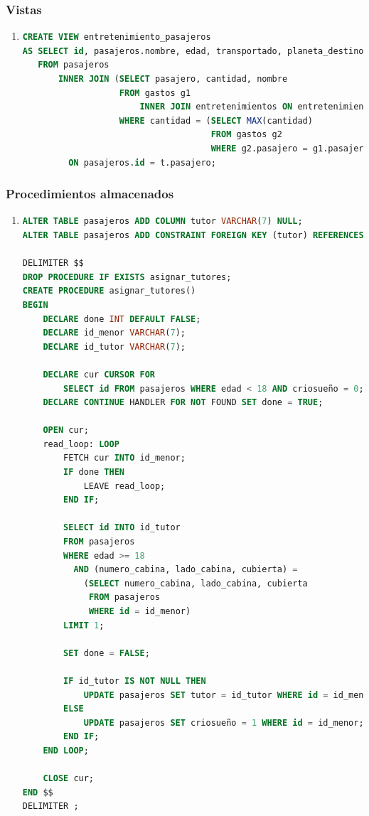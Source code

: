 \documentclass{db-practice}
\begin{document}
\subsubsection*{Vistas}
\begin{enumerate}
\item 
\begin{lstlisting}[language=SQL]
CREATE VIEW entretenimiento_pasajeros
AS SELECT id, pasajeros.nombre, edad, transportado, planeta_destino, sistema_destino, cubierta, numero_cabina, lado_cabina, cantidad, t.nombre AS entretenimiento
   FROM pasajeros
       INNER JOIN (SELECT pasajero, cantidad, nombre
                   FROM gastos g1
                       INNER JOIN entretenimientos ON entretenimientos.id = g1.entretenimiento
                   WHERE cantidad = (SELECT MAX(cantidad)
                                     FROM gastos g2
                                     WHERE g2.pasajero = g1.pasajero)) t
         ON pasajeros.id = t.pasajero;
\end{lstlisting}
\end{enumerate}

\subsubsection*{Procedimientos almacenados}
\begin{enumerate}
\item
\begin{lstlisting}[language=SQL]
ALTER TABLE pasajeros ADD COLUMN tutor VARCHAR(7) NULL;
ALTER TABLE pasajeros ADD CONSTRAINT FOREIGN KEY (tutor) REFERENCES pasajeros(id);

DELIMITER $$
DROP PROCEDURE IF EXISTS asignar_tutores;
CREATE PROCEDURE asignar_tutores()
BEGIN
    DECLARE done INT DEFAULT FALSE;
    DECLARE id_menor VARCHAR(7);
    DECLARE id_tutor VARCHAR(7);

    DECLARE cur CURSOR FOR 
        SELECT id FROM pasajeros WHERE edad < 18 AND criosueño = 0;
    DECLARE CONTINUE HANDLER FOR NOT FOUND SET done = TRUE;

    OPEN cur;
    read_loop: LOOP
        FETCH cur INTO id_menor;
        IF done THEN
            LEAVE read_loop;
        END IF;
                
        SELECT id INTO id_tutor
        FROM pasajeros
        WHERE edad >= 18
          AND (numero_cabina, lado_cabina, cubierta) = 
            (SELECT numero_cabina, lado_cabina, cubierta 
             FROM pasajeros 
             WHERE id = id_menor)
        LIMIT 1;
        
        SET done = FALSE;
        
        IF id_tutor IS NOT NULL THEN
            UPDATE pasajeros SET tutor = id_tutor WHERE id = id_menor;
        ELSE 
            UPDATE pasajeros SET criosueño = 1 WHERE id = id_menor;
        END IF;
    END LOOP;

    CLOSE cur;
END $$
DELIMITER ;
\end{lstlisting}
\end{enumerate}
\end{document}
